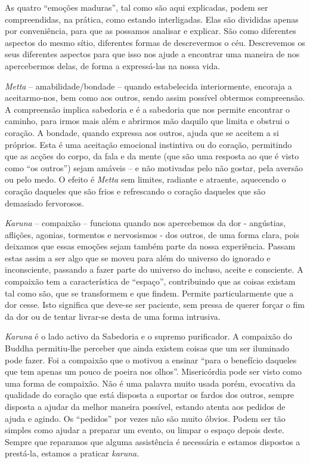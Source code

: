 As quatro ``emoções maduras'', tal como são aqui explicadas, podem ser
compreendidas, na prática, como estando interligadas. Elas são divididas
apenas por conveniência, para que as possamos analisar e explicar. São
como diferentes aspectos do mesmo sítio, diferentes formas de
descrevermos o céu. Descrevemos os seus diferentes aspectos para que
isso nos ajude a encontrar uma maneira de nos apercebermos delas, de
forma a expressá-las na nossa vida.

\emph{Metta} -- amabilidade/bondade -- quando estabelecida
interiormente, encoraja a aceitarmo-nos, bem como aos outros, sendo
assim possível obtermos compreensão. A compreensão implica sabedoria e é
a sabedoria que nos permite encontrar o caminho, para irmos mais além e
abrirmos mão daquilo que limita e obstrui o coração. A bondade, quando
expressa aos outros, ajuda que se aceitem a si próprios. Esta é uma
aceitação emocional instintiva ou do coração, permitindo que as acções
do corpo, da fala e da mente (que são uma resposta ao que é visto como
``os outros'') sejam amáveis -- e não motivadas pelo não gostar, pela
aversão ou pelo medo. O efeito é \emph{Metta} sem limites, radiante e
atraente, aquecendo o coração daqueles que são frios e refrescando o
coração daqueles que são demasiado fervorosos.

\emph{Karuna} -- compaixão -- funciona quando nos apercebemos da dor -
angústias, aflições, agonias, tormentos e nervosismos - dos outros, de
uma forma clara, pois deixamos que essas emoções sejam também parte da
nossa experiência. Passam estas assim a ser algo que se moveu para além
do universo do ignorado e inconsciente, passando a fazer parte do
universo do incluso, aceite e consciente. A compaixão tem a
característica de ``espaço'', contribuindo que as coisas existam tal
como são, que se transformem e que findem. Permite particularmente que a
dor cesse. Isto significa que deve-se ser paciente, sem pressa de querer
forçar o fim da dor ou de tentar livrar-se desta de uma forma intrusiva.

\emph{Karuna} é o lado activo da Sabedoria e o supremo purificador. A
compaixão do Buddha permitiu-lhe perceber que ainda existem coisas que
um ser iluminado pode fazer. Foi a compaixão que o motivou a ensinar
``para o benefício daqueles que tem apenas um pouco de poeira nos
olhos''. Misericórdia pode ser visto como uma forma de compaixão. Não é
uma palavra muito usada porém, evocativa da qualidade do coração que
está disposta a suportar os fardos dos outros, sempre disposta a ajudar
da melhor maneira possível, estando atenta aos pedidos de ajuda e
agindo. Os ``pedidos'' por vezes não são muito óbvios. Podem ser tão
simples como ajudar a preparar um evento, ou limpar o espaço depois
deste. Sempre que reparamos que alguma assistência é necessária e
estamos dispostos a prestá-la, estamos a praticar \emph{karuna.}

